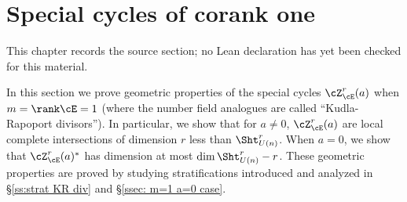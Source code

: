 \chapter{Special cycles of corank one}
\label{higher-siegel-weil-unitary-nonsingular-terms-chapter-09}

\begin{remark}
\label{higher-siegel-weil-unitary-nonsingular-terms-chapter-09-source}
This chapter records the source section; no Lean declaration has yet been checked for this material.
\notready
\end{remark}

\label{ssec: geometric properties}

In this section we prove geometric properties of the special cycles $\cZ^{r}_{\cE}(a)$ when $m= \rank \cE = 1$ (where the number field analogues are called ``Kudla-Rapoport divisors''). In particular, we show that for $a\ne0$, $\cZ^{r}_{\cE}(a)$  are local complete intersections of dimension $r$ less than $\Sht^{r}_{U(n)}$.  When $a=0$,  we show that  $\cZ^{r}_{\cE}(a)^{*}$ has dimension at most $\dim\Sht^{r}_{U(n)}-r$. These geometric properties are proved by studying stratifications introduced and analyzed in \S \ref{ss:strat KR div} and \S \ref{ssec: m=1 a=0 case}.



